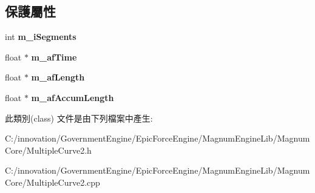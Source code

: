 \subsection*{保護屬性}
\begin{DoxyCompactItemize}
\item 
int {\bfseries m\+\_\+i\+Segments}\hypertarget{class_i_dream_sky_1_1_multiple_curve2_a9e4895dbd09f0d104874a6c2c606c4b2}{}\label{class_i_dream_sky_1_1_multiple_curve2_a9e4895dbd09f0d104874a6c2c606c4b2}

\item 
float $\ast$ {\bfseries m\+\_\+af\+Time}\hypertarget{class_i_dream_sky_1_1_multiple_curve2_ac667ad369f9e0054f83f7c4e0735bac7}{}\label{class_i_dream_sky_1_1_multiple_curve2_ac667ad369f9e0054f83f7c4e0735bac7}

\item 
float $\ast$ {\bfseries m\+\_\+af\+Length}\hypertarget{class_i_dream_sky_1_1_multiple_curve2_a3c5e04af9bfda71a3096039b887b423e}{}\label{class_i_dream_sky_1_1_multiple_curve2_a3c5e04af9bfda71a3096039b887b423e}

\item 
float $\ast$ {\bfseries m\+\_\+af\+Accum\+Length}\hypertarget{class_i_dream_sky_1_1_multiple_curve2_a7a35bd88cb09b9c077e10437135dc471}{}\label{class_i_dream_sky_1_1_multiple_curve2_a7a35bd88cb09b9c077e10437135dc471}

\end{DoxyCompactItemize}


此類別(class) 文件是由下列檔案中產生\+:\begin{DoxyCompactItemize}
\item 
C\+:/innovation/\+Government\+Engine/\+Epic\+Force\+Engine/\+Magnum\+Engine\+Lib/\+Magnum\+Core/Multiple\+Curve2.\+h\item 
C\+:/innovation/\+Government\+Engine/\+Epic\+Force\+Engine/\+Magnum\+Engine\+Lib/\+Magnum\+Core/Multiple\+Curve2.\+cpp\end{DoxyCompactItemize}
